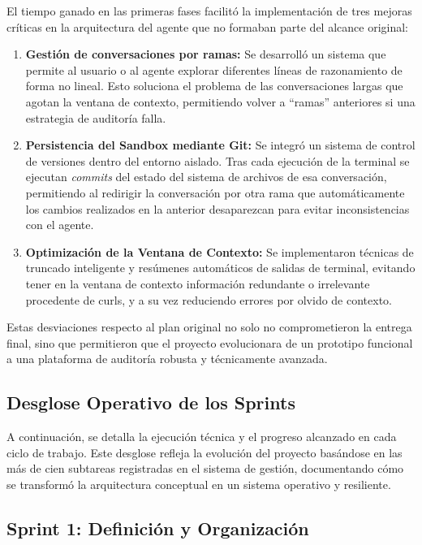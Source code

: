 El tiempo ganado en las primeras fases facilitó la implementación de tres mejoras críticas en la arquitectura del agente que no formaban parte del alcance original:

\begin{enumerate}
    \item \textbf{Gestión de conversaciones por ramas:} Se desarrolló un sistema que permite al usuario o al agente explorar diferentes líneas de razonamiento de forma no lineal. Esto soluciona el problema de las conversaciones largas que agotan la ventana de contexto, permitiendo volver a ``ramas'' anteriores si una estrategia de auditoría falla.
    \item \textbf{Persistencia del Sandbox mediante Git:} Se integró un sistema de control de versiones dentro del entorno aislado. Tras cada ejecución de la terminal se ejecutan \textit{commits} del estado del sistema de archivos de esa conversación, permitiendo al redirigir la conversación por otra rama que automáticamente los cambios realizados en la anterior desaparezcan para evitar inconsistencias con el agente.
    \item \textbf{Optimización de la Ventana de Contexto:} Se implementaron técnicas de truncado inteligente y resúmenes automáticos de salidas de terminal, evitando tener en la ventana de contexto información redundante o irrelevante procedente de curls, y a su vez reduciendo errores por olvido de contexto.
\end{enumerate}

Estas desviaciones respecto al plan original no solo no comprometieron la entrega final, sino que permitieron que el proyecto evolucionara de un prototipo funcional a una plataforma de auditoría robusta y técnicamente avanzada.

\subsection{Desglose Operativo de los Sprints}

A continuación, se detalla la ejecución técnica y el progreso alcanzado en cada ciclo de trabajo. Este desglose refleja la evolución del proyecto basándose en las más de cien subtareas registradas en el sistema de gestión, documentando cómo se transformó la arquitectura conceptual en un sistema operativo y resiliente.

\subsection*{Sprint 1: Definición y Organización}

